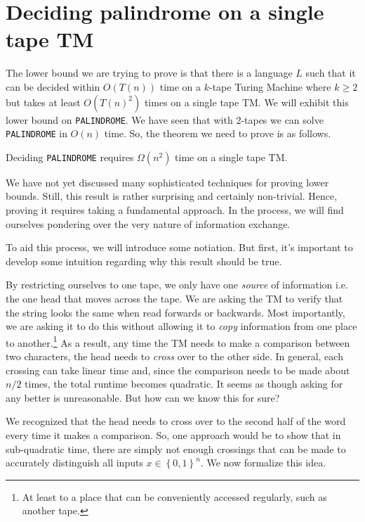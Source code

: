 \documentclass[usletter]{article}
\begin{document}
\section{Deciding palindrome on a single tape TM}

The lower bound we are trying to prove is that there is a language \(L\) such that it can be decided within \(O(T(n))\)
time on a \(k\)-tape Turing Machine where \(k \geq 2\) but takes at least
\(O(T(n)^2)\) times on a single tape TM. We will 
exhibit this lower bound on \verb|PALINDROME|. We have seen that with \(2\)-tapes
we can solve \verb|PALINDROME| in \(O(n)\) time. So, the theorem we need to prove is as follows.

\begin{theorem}
    Deciding \verb|PALINDROME| requires \(\Omega(n^2)\) time on a single tape TM.
\end{theorem}

We have not yet discussed many sophisticated techniques for proving lower bounds. Still, this result is 
rather surprising and certainly non-trivial. Hence, proving it requires taking a fundamental approach.
In the process, we will find ourselves pondering over the very nature of information 
exchange. 

To aid this process, we will introduce some notiation. But first, it's important to develop some
intuition regarding why this result should be true. 

By restricting ourselves to one tape, we only have one \textit{source} of information i.e. the one head
that moves across the tape. We are asking the TM to verify that the string looks the same when read forwards or backwards.
Most importantly, we are asking it to do this without allowing it to \textit{copy} information from one place to 
another.\footnote[2]{At least to a place that can be conveniently accessed regularly, such as another tape.} As a result, 
any time the TM needs to make a comparison between two characters, the head needs to \textit{cross} over to the other side. 
In general, each crossing can take linear time and, since the comparison needs to be made about \(n/2\) times, the total 
runtime becomes quadratic. It seems as though asking for any better is unreasonable. But how can we know this for sure?

We recognized that the head needs to cross over to the second half of the word every time it makes
a comparison. So, one approach would be to show that in sub-quadratic time, there are simply not enough crossings that can be made to 
accurately distinguish all inputs \(x \in \left\{ 0,1 \right\}^n\). We now formalize this idea. 
\end{document}
